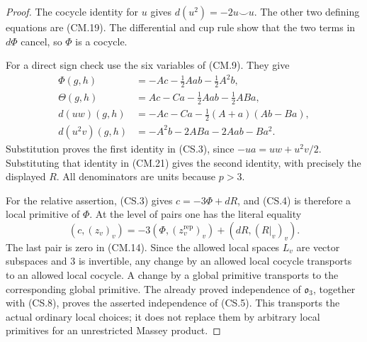 \begin{proof}
The cocycle identity for \(u\) gives
\(d(u^2)=-2u\smile u\).  The other two defining equations
are (CM.19).  The differential and cup rule show that the
two terms in \(d\Phi\) cancel, so \(\Phi\) is a cocycle.

For a direct sign check use the six variables of (CM.9).
They give
\[
\begin{split}
 \Phi(g,h)&=-Ac-\frac12Aab-\frac12A^2b,\\
 \Theta(g,h)&=Ac-Ca-\frac12Aab-\frac12ABa,\\
 d(uw)(g,h)&=-Ac-Ca-\frac12(A+a)(Ab-Ba),\\
 d(u^2v)(g,h)&=-A^2b-2ABa-2Aab-Ba^2.
\end{split}                                                   \tag{CS.7}
\]
Substitution proves the first identity in (CS.3), since
\(-ua=uw+u^2v/2\).  Substituting that identity in (CM.21)
gives the second identity, with precisely the displayed \(R\).
All denominators are units because \(p>3\).

For the relative assertion, (CS.3) gives
\(c=-3\Phi+dR\), and (CS.4) is therefore a local primitive
of \(\Phi\).  At the level of pairs one has the literal equality
\[
 (c,(z_v)_v)=-3(\Phi,(z^{\mathrm{rep}}_v)_v)
                              +(dR,(R|_v)_v).                 \tag{CS.8}
\]
The last pair is zero in (CM.14).  Since the allowed local
spaces \(L_v\) are vector subspaces and \(3\) is invertible,
any change by an allowed local cocycle transports to an
allowed local cocycle.  A change by a global primitive
transports to the corresponding global primitive.
The already proved independence of \(\mathfrak o_3\),
together with (CS.8), proves the asserted independence
of (CS.5).  This transports the actual ordinary local
choices; it does not replace them by arbitrary local
primitives for an unrestricted Massey product.
\end{proof}

